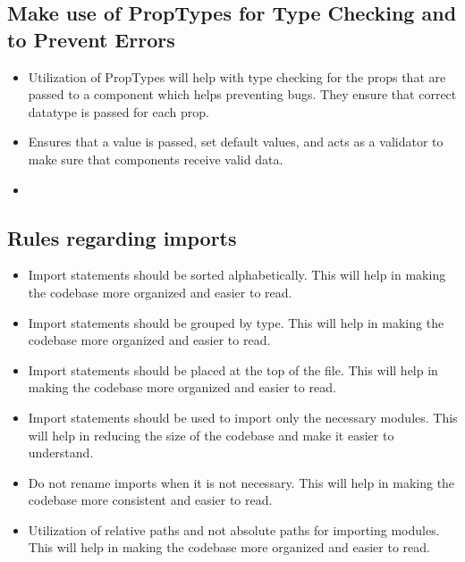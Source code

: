 \documentclass{article}
\begin{document}
\subsection{Make use of PropTypes for Type Checking and to Prevent Errors}
\begin{itemize}
    \item Utilization of PropTypes will help with type checking for the props that are passed to a component which helps preventing bugs. They ensure that correct datatype is passed for each prop.
    \item Ensures that a value is passed, set default values, and acts as a validator to make sure that components receive valid data.
    \item 
\end{itemize}
\subsection{Rules regarding imports}
\begin{itemize}
    \item Import statements should be sorted alphabetically. This will help in making the codebase more organized and easier to read.
    \item Import statements should be grouped by type. This will help in making the codebase more organized and easier to read.
    \item Import statements should be placed at the top of the file. This will help in making the codebase more organized and easier to read.
    \item Import statements should be used to import only the necessary modules. This will help in reducing the size of the codebase and make it easier to understand.
    \item Do not rename imports when it is not necessary. This will help in making the codebase more consistent and easier to read.
    \item Utilization of relative paths and not absolute paths for importing modules. This will help in making the codebase more organized and easier to read.
\end{itemize}
\end{document}
